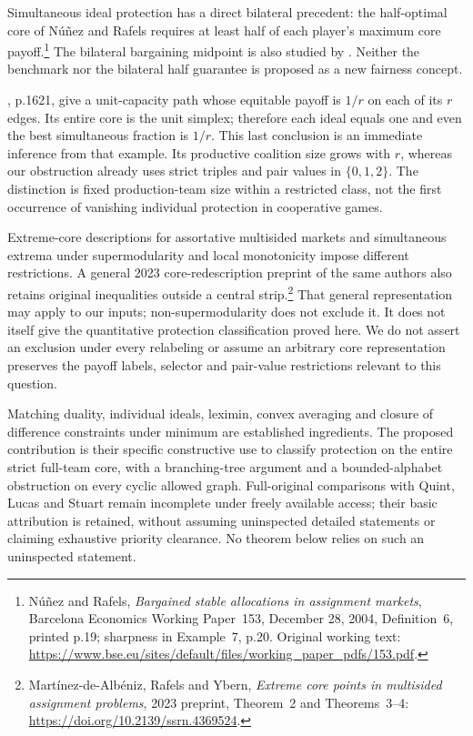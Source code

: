 \documentclass[11pt]{article}
\theoremstyle{remark}\newtheorem{remark}[theorem]{Remark}
\begin{document}
Simultaneous ideal protection has a direct bilateral precedent: the
half-optimal core of N\'u\~nez and Rafels requires at least half of each
player's maximum core payoff.\footnote{N\'u\~nez and Rafels,
\emph{Bargained stable allocations in assignment markets}, Barcelona Economics
Working Paper~153, December 28, 2004, Definition~6, printed p.19; sharpness
in Example~7, p.20. Original working text:
\url{https://www.bse.eu/sites/default/files/working_paper_pdfs/153.pdf}.}
The bilateral bargaining midpoint is also studied by
\citet{NunezRafels2008}. Neither the benchmark nor the bilateral half guarantee
is proposed as a new fairness concept.

\citet{Gangam2026}, p.1621, give a unit-capacity path whose equitable payoff
is $1/r$ on each of its $r$ edges. Its entire core is the unit simplex;
therefore each ideal equals one and even the best simultaneous fraction is
$1/r$. This last conclusion is an immediate inference from that example.
Its productive coalition size grows with $r$, whereas our obstruction already
uses strict triples and pair values in $\{0,1,2\}$. The distinction is fixed
production-team size within a restricted class, not the first occurrence of
vanishing individual protection in cooperative games.

Extreme-core descriptions for assortative multisided markets
\citep{Martinez2020} and simultaneous extrema under supermodularity and local
monotonicity \citep{Martinez2026} impose different restrictions. A general
2023 core-redescription preprint of the same authors also retains original
inequalities outside a central strip.\footnote{Mart\'inez-de-Alb\'eniz,
Rafels and Ybern, \emph{Extreme core points in multisided assignment problems},
2023 preprint, Theorem~2 and Theorems~3--4:
\url{https://doi.org/10.2139/ssrn.4369524}.}
That general representation may apply to our inputs; non-supermodularity
does not exclude it. It does not itself give the quantitative protection
classification proved here. We do not assert an exclusion under every
relabeling or assume an arbitrary core representation preserves the payoff
labels, selector and pair-value restrictions relevant to this question.

Matching duality, individual ideals, leximin, convex averaging and closure
of difference constraints under minimum are established ingredients. The
proposed contribution is their specific constructive use to classify
protection on the entire strict full-team core, with a branching-tree
argument and a bounded-alphabet obstruction on every cyclic allowed graph.
Full-original comparisons with Quint, Lucas and Stuart remain incomplete
under freely available access; their basic attribution is retained, without
assuming uninspected detailed statements or claiming exhaustive priority
clearance. No theorem below relies on such an uninspected statement.
\end{document}
